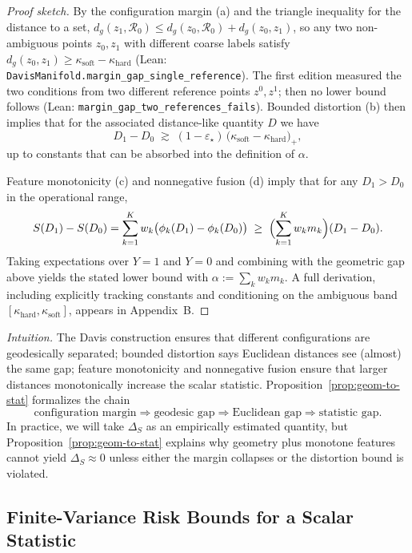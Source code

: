 \documentclass[11pt]{article}
\theoremstyle{remark}
\theoremstyle{plain}
\begin{document}
\begin{proof}[Proof sketch]
By the configuration margin (a) and the triangle inequality for the distance to a set,
$d_g(z_1,\mathcal{R}_0) \le d_g(z_0,\mathcal{R}_0) + d_g(z_0,z_1)$, so any two non-ambiguous points $z_0,z_1$ with
different coarse labels satisfy $d_g(z_0,z_1) \ge \kappa_{\mathrm{soft}} - \kappa_{\mathrm{hard}}$ (Lean:
\texttt{DavisManifold.margin\_gap\_single\_reference}). The first edition measured the two conditions from two
different reference points $z^0, z^1$; then no lower bound follows (Lean:
\texttt{margin\_gap\_two\_references\_fails}). Bounded distortion (b) then implies
that for the associated distance-like quantity $D$ we have
\[
D_1 - D_0 \;\gtrsim\; (1-\varepsilon_\star)\,
\bigl(\kappa_{\mathrm{soft}} - \kappa_{\mathrm{hard}}\bigr)_+,
\]
up to constants that can be absorbed into the definition of $\alpha$.

Feature monotonicity (c) and nonnegative fusion (d) imply that for any $D_1 > D_0$ in the
operational range,
\[
S(D_1) - S(D_0) = \sum_{k=1}^K w_k\bigl(\phi_k(D_1)-\phi_k(D_0)\bigr)
\;\ge\; \Bigl(\sum_{k=1}^K w_k m_k \Bigr) (D_1 - D_0).
\]
Taking expectations over $Y=1$ and $Y=0$ and combining with the geometric gap above yields
the stated lower bound with $\alpha := \sum_k w_k m_k$. A full derivation, including explicitly
tracking constants and conditioning on the ambiguous band $[\kappa_{\mathrm{hard}},\kappa_{\mathrm{soft}}]$,
appears in Appendix~B.
\end{proof}

\noindent\emph{Intuition.} The Davis construction ensures that different configurations are
geodesically separated; bounded distortion says Euclidean distances see (almost) the same gap;
feature monotonicity and nonnegative fusion ensure that larger distances monotonically increase
the scalar statistic. Proposition~\ref{prop:geom-to-stat} formalizes the chain
\[
\text{configuration margin} \Rightarrow
\text{geodesic gap} \Rightarrow
\text{Euclidean gap} \Rightarrow
\text{statistic gap}.
\]
In practice, we will take $\Delta_S$ as an empirically estimated quantity, but
Proposition~\ref{prop:geom-to-stat} explains why geometry plus monotone features cannot yield
$\Delta_S \approx 0$ unless either the margin collapses or the distortion bound is violated.

\subsection{Finite-Variance Risk Bounds for a Scalar Statistic}
\label{subsec:cantelli}
\end{document}
